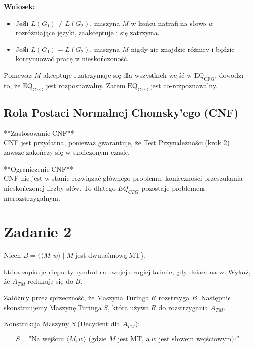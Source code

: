 \documentclass{article}
\begin{document}
\textbf{Wniosek:}
\begin{itemize}
    \item Jeśli $L(G_1) \neq L(G_2)$, maszyna $M$ w końcu natrafi na słowo $w$ rozróżniające języki, zaakceptuje i się zatrzyma.
    \item Jeśli $L(G_1) = L(G_2)$, maszyna $M$ nigdy nie znajdzie różnicy i będzie kontynuować pracę w nieskończoność.
\end{itemize}
Ponieważ $M$ akceptuje i zatrzymuje się dla wszystkich wejść w $\overline{\mathrm{EQ_{CFG}}}$, dowodzi to, że $\overline{\mathrm{EQ_{CFG}}}$ jest rozpoznawalny. Zatem $\mathrm{EQ_{CFG}}$ jest co-rozpoznawalny.

\subsection*{Rola Postaci Normalnej Chomsky'ego (CNF)}

**Zastosowanie CNF** \\
CNF jest przydatna, ponieważ gwarantuje, że Test Przynależności (krok 2) zawsze zakończy się w skończonym czasie.

**Ograniczenie CNF** \\
CNF nie jest w stanie rozwiązać głównego problemu: konieczności przeszukania nieskończonej liczby słów. To dlatego $EQ_{CFG}$ pozostaje problemem nierozstrzygalnym.


\section{Zadanie 2}
Niech $B = \{\langle M, w \rangle \mid M$ jest dwutaśmową MT\},

która zapisuje niepusty symbol na swojej drugiej taśmie, gdy działa na  w. Wykaż, że $A_{TM}$ redukuje się do $B$.

Załóżmy przez sprzeczność, że Maszyna Turinga $R$ rozstrzyga $B$. Następnie skonstruujemy Maszynę Turinga $S$, która używa $R$ do rozstrzygania $A_{TM}$.

Konstrukcja Maszyny $S$ (Decydent dla $A_{TM}$):

$$S = \text{"Na wejściu } \langle M, w \rangle \text{ (gdzie } M \text{ jest MT, a } w \text{ jest słowem wejściowym):''}$$
\end{document}
